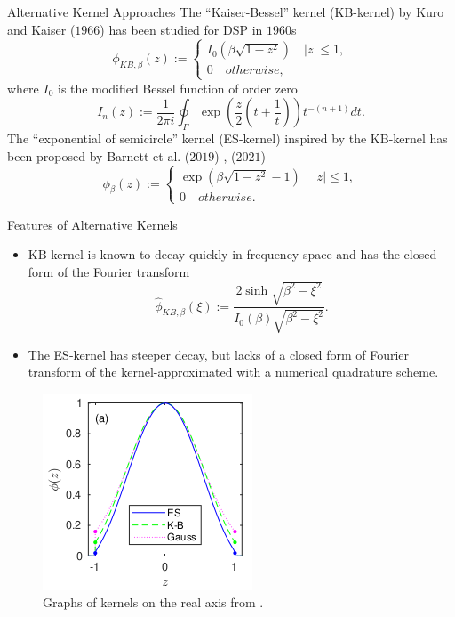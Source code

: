 \documentclass{beamer}
\begin{document}
\begin{frame}{Alternative Kernel Approaches}
  The ``Kaiser-Bessel'' kernel (KB-kernel) by Kuro and Kaiser ($1966$) \cite{Book-Kaiser} 
  has been studied for DSP in $1960$s
  \begin{equation}
    \phi_{KB,\beta}(z) :=
    \begin{cases}
      I_{0}\left(\beta\sqrt{1-z^2}\right) \quad |z| \le 1,\\
      0 \quad otherwise,
    \end{cases}
    \label{eq:KB-kernel}
  \end{equation}
  where $I_{0}$ is the modified Bessel function of order zero
  \begin{equation}
    I_{n}(z) := \frac{1}{2\pi i}\oint_{\Gamma}\exp\left(\frac{z}{2}(t+\frac{1}{t})\right)t^{-(n+1)}dt.
  \end{equation}
  The ``exponential of semicircle'' kernel (ES-kernel) inspired by the KB-kernel has been proposed by Barnett et al. ($2019$) \cite{SISC-2019-Barnett}, ($2021$) \cite{IEEE-2021-Barnett}
  \begin{equation}
    \phi_{\beta}(z) :=
    \begin{cases}
      \exp\left(\beta\sqrt{1-z^2} - 1\right) \quad |z| \le 1,\\
      0 \quad otherwise.
    \end{cases}
    \label{eq:ES-kernel}
  \end{equation}
\end{frame}

\begin{frame}{Features of Alternative Kernels}
  \begin{itemize}
    \item KB-kernel is known to decay quickly in frequency space 
      and has the closed form of the Fourier transform 
      \begin{equation}
        \hat{\phi}_{KB,\beta}(\xi) :=
        \frac{2\sinh\sqrt{\beta^2-\xi^2}}{I_{0}(\beta)\sqrt{\beta^2-\xi^2}}.
        \label{eq:FT-KB-kernel}
      \end{equation}
    \item The ES-kernel has steeper decay, but lacks of a closed form of Fourier transform of the kernel-approximated with a numerical quadrature scheme.
  \end{itemize}
  \begin{figure}
    \centering
    \includegraphics[height=.35\textheight,width=.4\textwidth]{images/comparison_kernels.png}
    \caption{Graphs of kernels on the real axis from \cite{SISC-2019-Barnett}.}
    \label{fig:kernel-comparison}
  \end{figure}
\end{frame}
\end{document}
